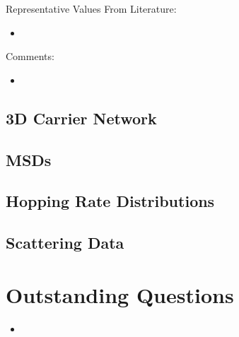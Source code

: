 \documentclass[12pt]{article}
\begin{document}
Representative Values From Literature:
\begin{itemize}
    \item{}
\end{itemize}

Comments:
\begin{itemize}
    \item{}
\end{itemize}

\subsection{3D Carrier Network}


\subsection{MSDs}


\subsection{Hopping Rate Distributions}


\subsection{Scattering Data}
 
\clearpage


\section{Outstanding Questions}


\begin{itemize}
    \item{}
\end{itemize}




\end{document}
